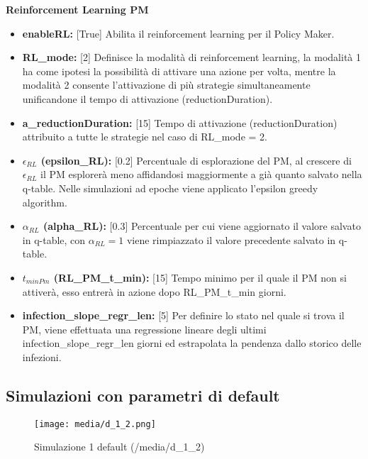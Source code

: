 \documentclass{article}
\begin{document}
{    \textbf{Reinforcement Learning PM}
    \begin{itemize}
        \item \textbf{enableRL:} [True] Abilita il reinforcement learning per il Policy Maker.
        \item \textbf{RL\_mode:} [2] Definisce la modalità di reinforcement learning, la modalità 1 ha come ipotesi la possibilità di attivare una azione per volta, mentre la modalità 2 consente l'attivazione di più strategie simultaneamente unificandone il tempo di attivazione (reductionDuration).
        \item \textbf{a\_reductionDuration:} [15] Tempo di attivazione (reductionDuration) attribuito a tutte le strategie nel caso di RL\_mode = 2.
        \item \textbf{$\epsilon_{RL}$ (epsilon\_RL):} [0.2] Percentuale di esplorazione del PM, al crescere di $\epsilon_{RL}$ il PM esplorerà meno affidandosi maggiormente a già quanto salvato nella q-table. Nelle simulazioni ad epoche viene applicato l'epsilon greedy algorithm.
        \item \textbf{$\alpha_{RL}$ (alpha\_RL):} [0.3] Percentuale per cui viene aggiornato il valore salvato in q-table, con $\alpha_{RL} = 1$ viene rimpiazzato il valore precedente salvato in q-table.
        \item \textbf{$t_{minPm}$ (RL\_PM\_t\_min):} [15] Tempo minimo per il quale il PM non si attiverà, esso entrerà in azione dopo RL\_PM\_t\_min giorni.
        \item \textbf{infection\_slope\_regr\_len:} [5] Per definire lo stato nel quale si trova il PM, viene effettuata una regressione lineare degli ultimi infection\_slope\_regr\_len giorni ed estrapolata la pendenza dallo storico delle infezioni.
    \end{itemize}

\subsection{Simulazioni con parametri di default}
\begin{figure}[H]
    \texttt{[image: media/d\_1\_2.png]}
    \caption{Simulazione 1 default (/media/d\_1\_2)}
    \label{fig:d_1_2}
\end{figure}
}
\end{document}
